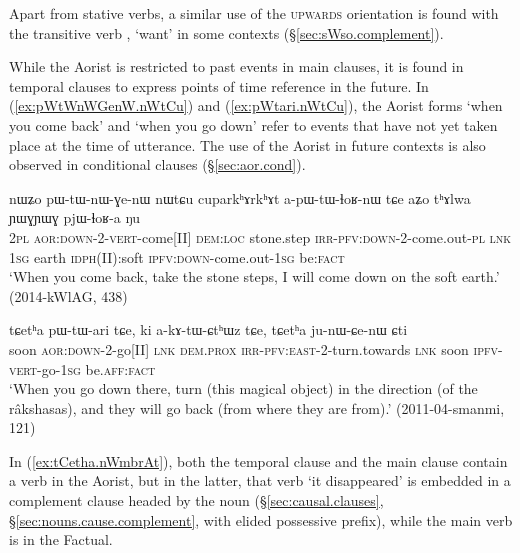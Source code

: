 Apart from stative verbs, a similar use of the \textsc{upwards} orientation is found with the transitive verb , `want' in some contexts (§\ref{sec:sWso.complement}).

While the Aorist is restricted to past events in main clauses, it is found in temporal clauses to express points of time reference in the future. In (\ref{ex:pWtWnWGenW.nWtCu}) and (\ref{ex:pWtari.nWtCu}), the Aorist forms   `when you come back' and  `when you go down' refer to events that have not yet taken place at the time of utterance. The use of the Aorist in future contexts is also observed in conditional clauses (§\ref{sec:aor.cond}).

\begin{exe}
\ex \label{ex:pWtWnWGenW.nWtCu}
 \gll nɯʑo pɯ-tɯ-nɯ-ɣe-nɯ nɯtɕu cuparkʰɤrkʰɤt a-pɯ-tɯ-ɬoʁ-nɯ tɕe aʑo tʰɤlwa ɲɯɣɲɯɣ pjɯ-ɬoʁ-a ŋu \\
 \textsc{2pl} \textsc{aor}:\textsc{down}-2-\textsc{vert}-come[II] \textsc{dem}:\textsc{loc} stone.step \textsc{irr}-\textsc{pfv}:\textsc{down}-2-come.out-\textsc{pl} \textsc{lnk} \textsc{1sg} earth \textsc{idph}(II):soft \textsc{ipfv}:\textsc{down}-come.out-\textsc{1sg} be:\textsc{fact} \\
\glt `When you come back, take the stone steps, I will come down on the soft earth.' (2014-kWlAG, 438)
\end{exe}

\begin{exe}
\ex \label{ex:pWtari.nWtCu}
 \gll tɕetʰa pɯ-tɯ-ari tɕe, ki a-kɤ-tɯ-ɕtʰɯz tɕe, tɕetʰa ju-nɯ-ɕe-nɯ ɕti \\
 soon \textsc{aor}:\textsc{down}-2-go[II] \textsc{lnk} \textsc{dem}.\textsc{prox} \textsc{irr}-\textsc{pfv}:\textsc{east}-2-turn.towards \textsc{lnk} soon \textsc{ipfv}-\textsc{vert}-go-\textsc{1sg} be.\textsc{aff}:\textsc{fact} \\
 \glt `When you go down there, turn (this magical object) in the direction (of the râkshasas), and they will go back (from where they are from).' (2011-04-smanmi, 121)
\end{exe}


In (\ref{ex:tCetha.nWmbrAt}), both the temporal clause and the main clause contain a verb in the Aorist, but in the latter, that verb  `it disappeared' is embedded in a complement clause headed by the noun  (§\ref{sec:causal.clauses}, §\ref{sec:nouns.cause.complement}, with elided possessive prefix), while the main verb  is in the Factual.


